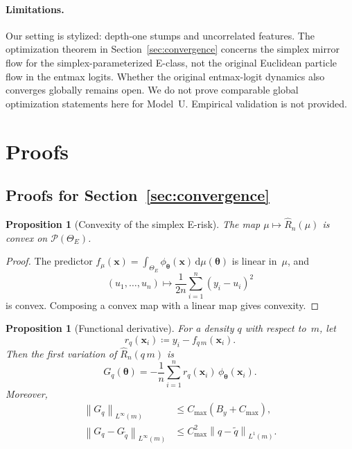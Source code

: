 \documentclass[11pt,a4paper]{article}
\newtheorem{proposition}[theorem]{Proposition}
\theoremstyle{definition}
\theoremstyle{remark}
\newcommand{\vtheta}{\boldsymbol{\theta}}
\newcommand{\vx}{\mathbf{x}}
\newcommand{\dd}{\mathrm{d}}
\newcommand{\dmu}{\dd\mu}
\newcommand{\norm}[1]{\left\|#1\right\|}
\begin{document}
\paragraph{Limitations.}
Our setting is stylized: depth-one stumps
and uncorrelated features.
The optimization theorem in
Section~\ref{sec:convergence} concerns the
simplex mirror flow for the
simplex-parameterized E-class, not the
original Euclidean particle flow in the
entmax logits.
Whether the original entmax-logit dynamics
also converges globally remains open.
We do not prove comparable global
optimization statements here for Model~U.
Empirical validation is not provided.


\appendix
\section{Proofs}

\subsection{Proofs for Section~\ref{sec:convergence}}
\label{app:e-mirror}

\begin{proposition}[Convexity of the simplex E-risk]
  \label{prop:E-convex}
  The map
  \(
    \mu \mapsto \hat R_n(\mu)
  \)
  is convex on \(\mathcal{P}(\Theta_E)\).
\end{proposition}

\begin{proof}
  The predictor
  \(
    f_\mu(\vx)
    =
    \int_{\Theta_E}\phi_{\vtheta}(\vx)\,\dmu(\vtheta)
  \)
  is linear in~\(\mu\), and
  \[
    (u_1,\dots,u_n)
    \mapsto
    \frac{1}{2n}\sum_{i=1}^n (y_i-u_i)^2
  \]
  is convex.
  Composing a convex map with a linear map
  gives convexity.
\end{proof}

\begin{proposition}[Functional derivative]
  \label{prop:E-derivative}
  For a density \(q\) with respect to~\(m\),
  let
  \[
    r_q(\vx_i)
    \coloneqq
    y_i - f_{q\,m}(\vx_i).
  \]
  Then the first variation of \(\hat R_n(q\,m)\)
  is
  \[
    G_q(\vtheta)
    =
    -\frac{1}{n}
    \sum_{i=1}^n
    r_q(\vx_i)\,\phi_{\vtheta}(\vx_i).
  \]
  Moreover,
  \begin{align}
    \norm{G_q}_{L^\infty(m)}
    &\le C_{\max}(B_y + C_{\max}),
    \label{eq:app-G-bdd}\\
    \norm{G_q-G_{\tilde q}}_{L^\infty(m)}
    &\le
    C_{\max}^2 \norm{q-\tilde q}_{L^1(m)}.
    \label{eq:app-G-lip}
  \end{align}
\end{proposition}
\end{document}
